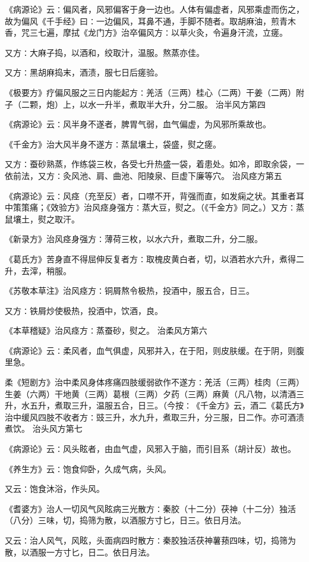 \documentclass[a4paper,12pt,UTF8,twoside]{ctexbook}
\begin{document}
《病源论》云∶偏风者，风邪偏客于身一边也。人体有偏虚者，风邪乘虚而伤之，故为偏风《千手经》曰∶一边偏风，耳鼻不通，手脚不随者。取胡麻油，煎青木香，咒三七遍，摩拭《龙门方》治卒偏风方∶以草火灸，令遍身汗流，立瘥。

又方∶大麻子捣，以酒和，绞取汁，温服。熬蒸亦佳。

又方∶黑胡麻捣末，酒渍，服七日后瘥验。

《极要方》疗偏风服之三日内能起方∶羌活（三两）桂心（二两）干姜（二两）附子（二颗，炮）上，以水一升半，煮取半大升，分二服。
治半风方第四

《病源论》云∶风半身不遂者，脾胃气弱，血气偏虚，为风邪所乘故也。

《千金方》治大风半身不遂方∶蒸鼠壤土，袋盛，熨之瘥。

又方∶蚕砂熟蒸，作练袋三枚，各受七升热盛一袋，着患处。如冷，即取余袋，一依前法，又方∶灸风池、肩、曲池、阳陵泉、巨虚下廉等穴。
治风痉方第五

《病源论》云∶风痉（充至反）者，口噤不开，背强而直，如发痫之状。其重者耳中策策痛；《效验方》治风痉身强方∶蒸大豆，熨之。（《千金方》同之。）又方∶蒸鼠壤土，熨之取汗。

《新录方》治风痉身强方∶薄荷三枚，以水六升，煮取二升，分二服。

《葛氏方》苦身直不得屈伸反复者方∶取槐皮黄白者，切，以酒若水六升，煮得二升，去滓，稍服。

《苏敬本草注》治风痉方∶铜屑熬令极热，投酒中，服五合，日三。

又方∶铁屑炒使极热，投酒中，饮酒，良。

《本草稽疑》治风痉方∶蒸蚕砂，熨之。
治柔风方第六

《病源论》云∶柔风者，血气俱虚，风邪并入，在于阳，则皮肤缓。在于阴，则腹里急。

柔《短剧方》治中柔风身体疼痛四肢缓弱欲作不遂方∶羌活（三两）桂肉（三两）生姜（六两）干地黄（三两）葛根（三两）夕药（三两）麻黄（凡八物，以清酒三升，水五升，煮取三升，温服五合，日三。（今按∶《千金方》云，酒二《葛氏方》治中缓风四肢不收者方∶豉三升，水九升，煮取三升，分三服，日二作。亦可酒渍煮饮。
治头风方第七

《病源论》云∶风头眩者，由血气虚，风邪入于脑，而引目系（胡计反）故也。

《养生方》云∶饱食仰卧，久成气病，头风。

又云∶饱食沐浴，作头风。

《耆婆方》治人一切风气风眩病三光散方∶秦胶（十二分）茯神（十二分）独活（八分）三味，切，捣筛为散，以酒服方寸匕，日三。依日月法。

又云∶治人风气，风眩，头面病四时散方∶秦胶独活茯神薯蓣四味，切，捣筛为散，以酒服一方寸匕，日二。依日月法。
\end{document}
